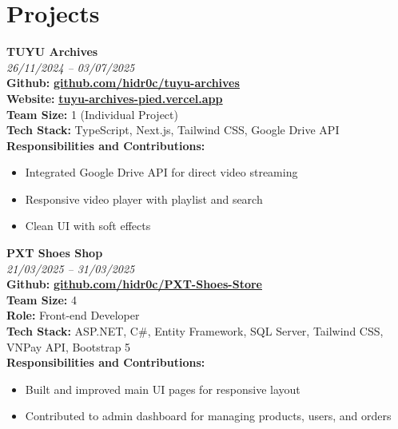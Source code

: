 \documentclass[a4paper,11pt]{article}
\begin{document}
\section{Projects}
\begin{minipage}[t]{\linewidth}
  \textbf{TUYU Archives} \\
  \small\textit{\hspace*{0.8\linewidth}26/11/2024 – 03/07/2025} \\
  \textbf{Github:} \href{https://github.com/hidr0c/tuyu-archives}{\textbf{\underline{github.com/hidr0c/tuyu-archives}}} \\
  \textbf{Website:} \href{https://tuyu-archives-pied.vercel.app}{\textbf{\underline{tuyu-archives-pied.vercel.app}}} \\
  \textbf{Team Size:} 1 (Individual Project) \\
  \textbf{Tech Stack:} TypeScript, Next.js, Tailwind CSS, Google Drive API \\
  \textbf{Responsibilities and Contributions: }
  \begin{itemize}[nosep,leftmargin=1.2em,itemsep=2pt]
    \item Integrated Google Drive API for direct video streaming
    \item Responsive video player with playlist and search
    \item Clean UI with soft effects
  \end{itemize}
\end{minipage}

\vspace{0.5em}

\begin{minipage}[t]{\linewidth}
  \textbf{PXT Shoes Shop} \\
  \small\textit{\hspace*{0.8\linewidth}21/03/2025 – 31/03/2025} \\
  \textbf{Github:} \href{https://github.com/hidr0c/PXT-Shoes-Store}{\textbf{\underline{github.com/hidr0c/PXT-Shoes-Store}}} \\
  \textbf{Team Size:} 4 \\
  \textbf{Role:} Front-end Developer \\
  \textbf{Tech Stack:} ASP.NET, C\#, Entity Framework, SQL Server, Tailwind CSS, VNPay API, Bootstrap 5 \\
  \textbf{Responsibilities and Contributions:}
  \begin{itemize}[nosep,leftmargin=1.2em,itemsep=2pt]
    \item Built and improved main UI pages for responsive layout
    \item Contributed to admin dashboard for managing products, users, and orders
  \end{itemize}
\end{minipage}
\end{document}
